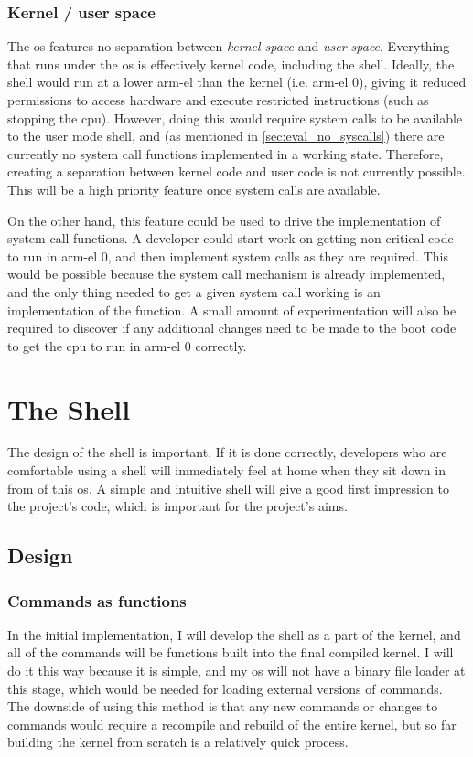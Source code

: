 \documentclass{article}
\begin{document}
\subsubsection{Kernel / user space}
The \gls{os} features no separation between \emph{kernel space} and \emph{user
space}. Everything that runs under the \gls{os} is effectively kernel code,
including the shell. Ideally, the shell would run at a lower \gls{arm-el} than
the kernel (i.e. \gls{arm-el} 0), giving it reduced permissions to access
hardware and execute restricted instructions (such as stopping the \gls{cpu}).
However, doing this would require system calls to be available to the user mode
shell, and (as mentioned in \autoref{sec:eval_no_syscalls}) there are currently
no system call functions implemented in a working state. Therefore, creating a
separation between kernel code and user code is not currently possible. This
will be a high priority feature once system calls are available.

On the other hand, this feature could be used to drive the implementation of
system call functions. A developer could start work on getting non-critical
code to run in \gls{arm-el} 0, and then implement system calls as they are
required. This would be possible because the system call mechanism is already
implemented, and the only thing needed to get a given system call working is an
implementation of the function. A small amount of experimentation will also be
required to discover if any additional changes need to be made to the boot code
to get the \gls{cpu} to run in \gls{arm-el} 0 correctly.

\section{The Shell}
The design of the shell is important. If it is done correctly, developers who
are comfortable using a shell will immediately feel at home when they sit down
in from of this \gls{os}. A simple and intuitive shell will give a good first
impression to the project's code, which is important for the project's aims.

\subsection{Design}

\subsubsection{Commands as functions}
In the initial implementation, I will develop the shell as a part of the
kernel, and all of the commands will be functions built into the final compiled
kernel. I will do it this way because it is simple, and my \gls{os} will not
have a binary file loader at this stage, which would be needed for loading
external versions of commands. The downside of using this method is that any
new commands or changes to commands would require a recompile and rebuild of
the entire kernel, but so far building the kernel from scratch is a relatively
quick process.
\end{document}
